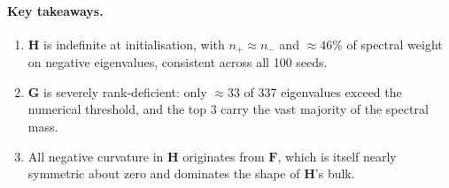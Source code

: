\documentclass[12pt,a4paper]{article}
\newcommand{\bH}{\mathbf{H}}
\newcommand{\bG}{\mathbf{G}}
\newcommand{\bF}{\mathbf{F}}
\begin{document}
\paragraph{Key takeaways.}
\begin{enumerate}
  \item $\bH$ is indefinite at initialisation, with $n_+ \approx n_-$ and $\approx 46\%$ of spectral weight on negative eigenvalues, consistent across all 100 seeds.
  \item $\bG$ is severely rank-deficient: only $\approx 33$ of 337 eigenvalues exceed the numerical threshold, and the top 3 carry the vast majority of the spectral mass.
  \item All negative curvature in $\bH$ originates from $\bF$, which is itself nearly symmetric about zero and dominates the shape of $\bH$'s bulk.
\end{enumerate}
\end{document}
